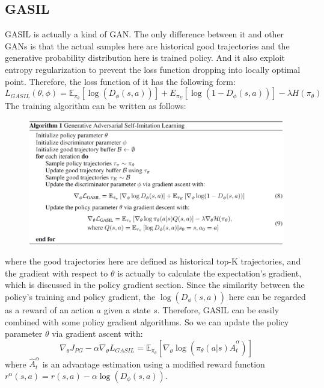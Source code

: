 \documentclass[UTF8, a4paper, 11pt]{article}
\begin{document}
\subsection{GASIL}
GASIL is actually a kind of GAN. The only difference between it and other GANs is that the actual samples here are historical good trajectories and the generative
probability distribution here is trained policy. And it also exploit entropy regularization to prevent the loss function dropping into locally optimal point.
Therefore, the loss function of it has the following form:
$$L_{GASIL}(\theta,\phi)=\mathbb{E}_{\pi_\theta}[\log(D_{\phi}(s,a))]+E_{\pi_E}[\log(1-D_\phi(s,a))]-\lambda H(\pi_\theta)$$
The training algorithm can be written as follows:
\begin{figure}[H]
    \centering
    \includegraphics[width = \textwidth]{algorithm.png}
\end{figure}
where the good trajectories here are defined as historical top-K trajectories, and the gradient with respect to $\theta$ is actually to calculate the expectation's
gradient, which is discussed in the policy gradient section. Since the similarity between the policy's training and policy gradient, the $\log(D_\phi(s,a))$ here can be
regarded as a reward of an action $a$ given a state $s$. Therefore, GASIL can be easily combined with some policy gradient algorithms. So we can update the policy
parameter $\theta$ via gradient ascent with:
$$\nabla_\theta J_{PG}-\alpha\nabla_\theta L_{GASIL}=\mathbb{E}_{\pi_\theta}[\nabla_\theta\log(\pi_\theta(a|s)\hat A_t^\alpha)]$$
where $\hat A_t^\alpha$ is an advantage estimation using a modified reward function $r^\alpha(s,a)=r(s,a)-\alpha\log(D_\phi(s,a))$.
\end{document}
